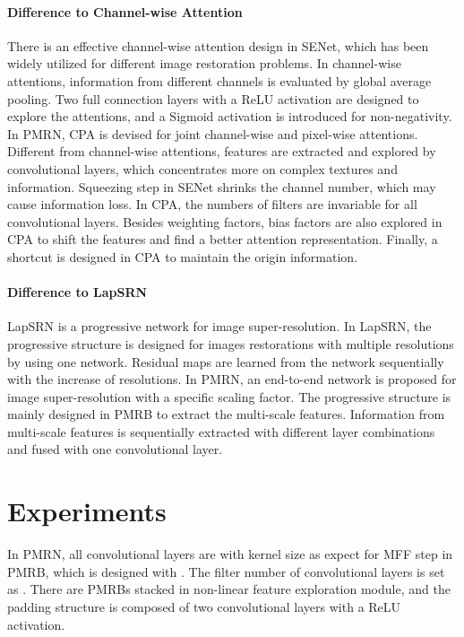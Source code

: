 \documentclass[journal]{IEEEtran}
\begin{document}
\paragraph{Difference to Channel-wise Attention~\cite{senet_hu2018}}
There is an effective channel-wise attention design in SENet, which has been widely utilized for different image restoration problems. In channel-wise attentions, information from different channels is evaluated by global average pooling. Two full connection layers with a ReLU activation are designed to explore the attentions, and a Sigmoid activation is introduced for non-negativity.
In PMRN, CPA is devised for joint channel-wise and pixel-wise attentions. Different from channel-wise attentions, features are extracted and explored by convolutional layers, which concentrates more on complex textures and information. Squeezing step in SENet shrinks the channel number, which may cause information loss. In CPA, the numbers of filters are invariable for all convolutional layers. Besides weighting factors, bias factors are also explored in CPA to shift the features and find a better attention representation. Finally, a shortcut is designed in CPA to maintain the origin information.

\paragraph{Difference to LapSRN~\cite{lapsrn}}
LapSRN is a progressive network for image super-resolution. In LapSRN, the progressive structure is designed for images restorations with multiple resolutions by using one network. Residual maps are learned from the network sequentially with the increase of resolutions. In PMRN, an end-to-end network is proposed for image super-resolution with a specific scaling factor. The progressive structure is mainly designed in PMRB to extract the multi-scale features. Information from multi-scale features is sequentially extracted with different layer combinations and fused with one convolutional layer.
 
 
 
 
 
 
 
 
 
 
 
 
 
\section{Experiments}
In PMRN, all convolutional layers are with kernel size as  expect for MFF step in PMRB, which is designed with . The filter number of convolutional layers is set as . There are  PMRBs stacked in non-linear feature exploration module, and the padding structure is composed of two convolutional layers with a ReLU activation.
\end{document}
